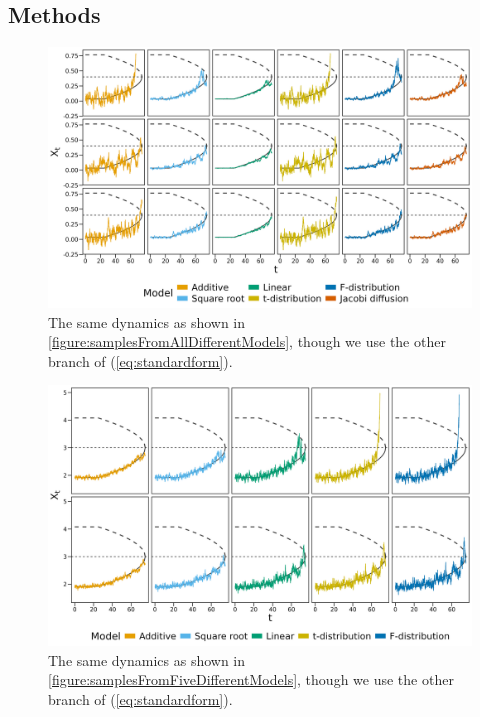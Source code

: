 \subsection{Methods}
\begin{figure}[h!]
    \begin{center}
        \includegraphics[scale = .1]{figures/sample_paths_plot_small_scale_reversed.jpeg}
        \caption{The same dynamics as shown in \ref{figure:samplesFromAllDifferentModels}, though we use the other branch of (\ref{eq:standardform}).}
        \label{figure:samplesFromAllDifferentModelsReversed}
    \end{center}
\end{figure}

\begin{figure}[h!]
    \begin{center}
        \includegraphics[scale = .1]{figures/sample_paths_plot_big_scale_reversed.jpeg}
        \caption{The same dynamics as shown in \ref{figure:samplesFromFiveDifferentModels}, though we use the other branch of (\ref{eq:standardform}).}
        \label{figure:samplesFromFiveDifferentModelsReversed}
    \end{center}
\end{figure}
